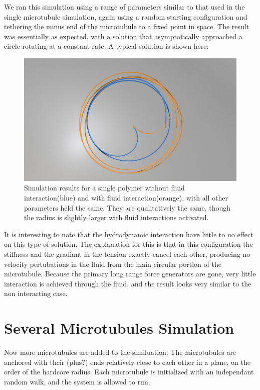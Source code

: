 \documentclass[11pt]{ucthesis}
\begin{document}
{We ran this simulation using a range of parameters similar to that used in the single microtubule simulation, again using a random starting configuration and tethering the minus end of the microtubule to a fixed point in space. 
The result was essentially as expected, with a solution that asymptotically approached a circle rotating at a constant rate. A typical solution is shown here:

\begin{figure}[htp]
\begin{center}
\includegraphics[width=\hsize]{singtest.png}
\caption{ 
Simulation results for a single polymer without fluid interaction(blue) and with fluid interaction(orange), with all other parameters held the same. They are qualitatively the same, though the radius is slightly larger with fluid interactions activated.
}
\label{fig:singtest}
\end{center}
\end{figure}

It is interesting to note that the hydrodynamic interaction have little to no effect on this type of solution. 
The explanation for this is that in this configuration the stiffness and the gradiant in the tension exactly cancel each other, producing no velocity pertubations in the fluid from the main circular portion of the microtubule.
Because the primary long range force generators are gone, very little interaction is achieved through the fluid, and the result looks very similar to the non interacting case.

\section{Several Microtubules Simulation}
Now more microtubules are added to the similuation. The microtubules are anchored with their (plus?) ends relatively close to each other in a plane, on the order of the hardcore radius. 
Each microtubule is initialized with an independant random walk, and the system is allowed to run.


}
\end{document}
